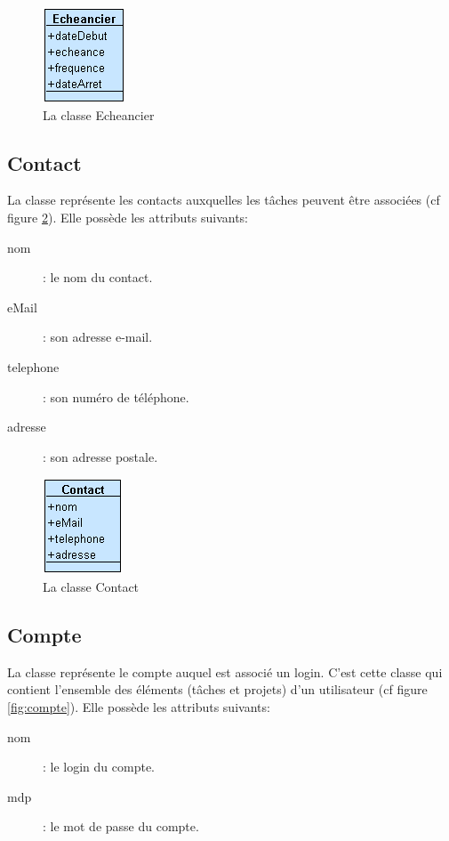 \begin{figure}[htbp]
	\centering
		\includegraphics[scale=1]{images/L3/structureDonnee/echeancier.png}
	\caption{La classe Echeancier}
	\label{fig:Echeancier}
\end{figure}

\subsection{Contact}

	La classe  représente les contacts auxquelles les tâches peuvent être associées (cf figure \ref{fig:Contact}). Elle possède les attributs suivants:
	\begin{description}
		\item[nom]: le nom du contact.
		\item[eMail]: son adresse e-mail.
		\item[telephone]: son numéro de téléphone.
		\item[adresse]: son adresse postale.
	\end{description}

\begin{figure}[htbp]
	\centering
		\includegraphics[scale=1]{images/L3/structureDonnee/contact.png}
	\caption{La classe Contact}
	\label{fig:Contact}
\end{figure}

\subsection{Compte}

La classe  représente le compte auquel est associé un login.
C'est cette classe qui contient l'ensemble des éléments (tâches et projets) d'un utilisateur (cf figure \ref{fig:compte}).
Elle possède les attributs suivants:
	\begin{description}
		\item[nom]: le login du compte.
		\item[mdp]: le mot de passe du compte.
	\end{description}

